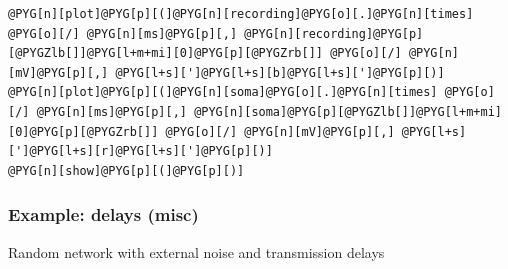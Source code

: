 \documentclass[letterpaper,10pt,english]{manual}
\begin{document}
\begin{Verbatim}[commandchars=@\[\]]
@PYG[n][plot]@PYG[p][(]@PYG[n][recording]@PYG[o][.]@PYG[n][times] @PYG[o][/] @PYG[n][ms]@PYG[p][,] @PYG[n][recording]@PYG[p][@PYGZlb[]]@PYG[l+m+mi][0]@PYG[p][@PYGZrb[]] @PYG[o][/] @PYG[n][mV]@PYG[p][,] @PYG[l+s][']@PYG[l+s][b]@PYG[l+s][']@PYG[p][)]
@PYG[n][plot]@PYG[p][(]@PYG[n][soma]@PYG[o][.]@PYG[n][times] @PYG[o][/] @PYG[n][ms]@PYG[p][,] @PYG[n][soma]@PYG[p][@PYGZlb[]]@PYG[l+m+mi][0]@PYG[p][@PYGZrb[]] @PYG[o][/] @PYG[n][mV]@PYG[p][,] @PYG[l+s][']@PYG[l+s][r]@PYG[l+s][']@PYG[p][)]
@PYG[n][show]@PYG[p][(]@PYG[p][)]
\end{Verbatim}

\resetcurrentobjects
\hypertarget{--doc-examples-misc_delays}{}

\hypertarget{index-46}{}\subsubsection{Example: delays (misc)}

Random network with external noise and transmission delays
\end{document}
